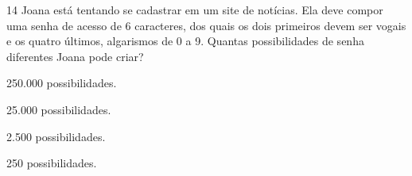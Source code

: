 








\num{14} Joana está tentando se cadastrar em um site de notícias. Ela deve
compor uma senha de acesso de 6 caracteres, dos quais os dois primeiros
devem ser vogais e os quatro últimos, algarismos de 0 a 9. Quantas
possibilidades de senha diferentes Joana pode criar?

\begin{escolha}
\item 250.000 possibilidades.
\item 25.000 possibilidades.
\item 2.500 possibilidades.
\item 250 possibilidades.
\end{escolha}





